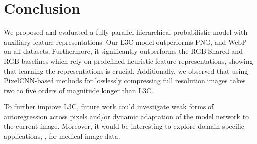 \section{Conclusion}

We proposed and evaluated a fully parallel hierarchical probabilistic model with auxiliary feature representations. 
Our L3C model outperforms PNG, \jpegk and WebP on all datasets. Furthermore, it significantly outperforms the RGB Shared and RGB baselines which rely on predefined heuristic feature representations, showing that learning the representations is crucial. Additionally, we observed that using PixelCNN-based methods for losslessly compressing full resolution images takes two to five orders of magnitude longer than L3C.

To further improve L3C, future work could investigate weak forms of autoregression across pixels and/or dynamic adaptation of the model network to the current image. Moreover, it would be interesting to explore domain-specific applications, \eg, for medical image data.

\newpage

